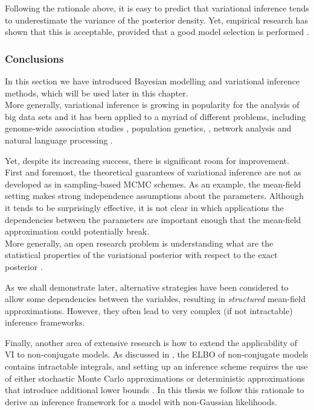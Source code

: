 Following the rationale above, it is easy to predict that variational inference tends to underestimate the variance of the posterior density. Yet, empirical research has shown that this is acceptable, provided that a good model selection is performed \cite{Blei2006}.


\subsubsection{Conclusions}

In this section we have introduced Bayesian modelling and variational inference methods, which will be used later in this chapter.\\
More generally, variational inference is growing in popularity for the analysis of big data sets and it has been applied to a myriad of different problems, including genome-wide association studies \cite{Carbonetto2012}, population genetics, \cite{Raj2014}, network analysis \cite{Sanguinetti2006} and natural language processing \cite{Blei2003}.

Yet, despite its increasing success, there is significant room for improvement. First and foremost, the theoretical guarantees of variational inference are not as developed as in sampling-based MCMC schemes\cite{Blei2016,Zhang2017,Nakajima2007}. As an example, the mean-field setting makes strong independence assumptions about the parameters.  Although it tends to be surprisingly effective, it is not clear in which applications the dependencies between the parameters are important enough that the mean-field approximation could potentially break.\\
More generally, an open research problem is understanding what are the statistical properties of the variational posterior with respect to the exact posterior \cite{Blei2016,Zhang2017}.

As we shall demonstrate later, alternative strategies have been considered to allow some dependencies between the variables, resulting in \textit{structured} mean-field approximations\cite{Hoffman2014,Titsias2011}. However, they often lead to very complex (if not intractable) inference frameworks. 

Finally, another area of extensive research is how to extend the applicability of VI to non-conjugate models. As discussed in , the ELBO of non-conjugate models contains intractable integrals, and setting up an inference scheme requires the use of either stochastic Monte Carlo approximations or deterministic approximations that introduce additional lower bounds \cite{Zhang2017,Seeger2012,Khan2017}. In this thesis we follow this rationale to derive an inference framework for a model with non-Gaussian likelihoods.
